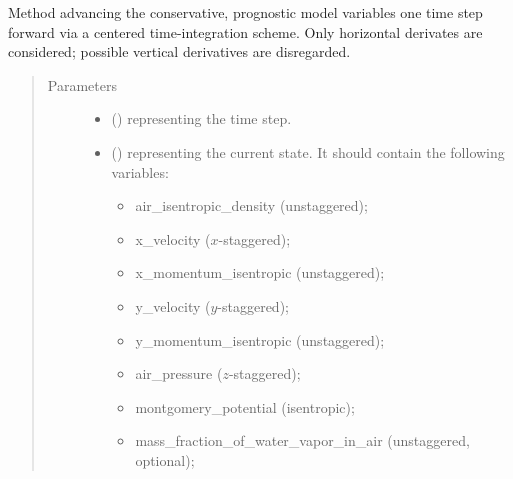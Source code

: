\documentclass[letterpaper,10pt,english]{sphinxmanual}
\begin{document}
\begin{fulllineitems}
\begin{fulllineitems}
\end{fulllineitems}


\begin{fulllineitems}
\label{\detokenize{api:dycore.prognostic_isentropic_centered.PrognosticIsentropicCentered.step_neglecting_vertical_advection}}
Method advancing the conservative, prognostic model variables one time step forward via a
centered time-integration scheme. Only horizontal derivates are considered; possible vertical
derivatives are disregarded.
\begin{quote}\begin{description}
\item[{Parameters}] \leavevmode\begin{itemize}
\item {} 
 () \textendash{}  representing the time step.

\item {} 
 () \textendash{} 
{\hyperref[\detokenize{api:storages.state_isentropic.StateIsentropic}]{}} representing the current state.
It should contain the following variables:
\begin{itemize}
\item {} 
air\_isentropic\_density (unstaggered);

\item {} 
x\_velocity (\(x\)-staggered);

\item {} 
x\_momentum\_isentropic (unstaggered);

\item {} 
y\_velocity (\(y\)-staggered);

\item {} 
y\_momentum\_isentropic (unstaggered);

\item {} 
air\_pressure (\(z\)-staggered);

\item {} 
montgomery\_potential (isentropic);

\item {} 
mass\_fraction\_of\_water\_vapor\_in\_air (unstaggered, optional);


\end{itemize}
\end{itemize}
\end{description}
\end{quote}
\end{fulllineitems}
\end{fulllineitems}
\end{document}

